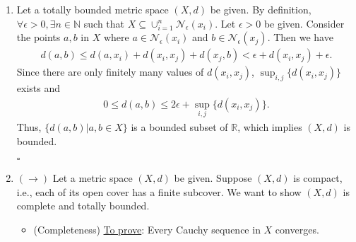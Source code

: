 \documentclass[11pt]{article}
\begin{document}
\begin{enumerate}
	\item Let a totally bounded metric space $(X,d)$ be given. By definition, $\forall \epsilon > 0, \exists n\in \mathbb{N}$ such that $X \subseteq \cup^n_{i=1}\mathcal{N}_\epsilon(x_i)$. Let $\epsilon > 0$ be given. Consider the points $a,b$ in $X$ where $a\in \mathcal{N}_\epsilon(x_i)$ and $b \in \mathcal{N}_\epsilon(x_j)$. Then we have
	\begin{align*}
	d(a,b) \leq d(a,x_i) + d(x_i,x_j) + d(x_j,b) < \epsilon + d(x_i,x_j) + \epsilon.
	\end{align*}
	Since there are only finitely many values of $d(x_i,x_j)$, $\sup_{i,j}\{ d(x_i,x_j) \}$ exists and
	\begin{align*}
	0 \leq d(a,b) \leq 2\epsilon + \sup_{i,j}\{ d(x_i,x_j) \}.
	\end{align*}
	Thus, $\{d(a,b)| a,b \in X\}$ is a bounded subset of $\mathbb{R}$, which implies $(X,d)$ is bounded.
	
	\hfill $\square$
	\item  $(\rightarrow)$ Let a metric space $(X,d)$ be given. Suppose $(X,d)$ is compact, i.e., each of its open cover has a finite subcover. We want to show $(X,d)$ is complete and totally bounded. 
	\begin{itemize}
		\item (Completeness) \underline{To prove}: Every Cauchy sequence in $X$ converges. 
		

\end{itemize}
\end{enumerate}
\end{document}
